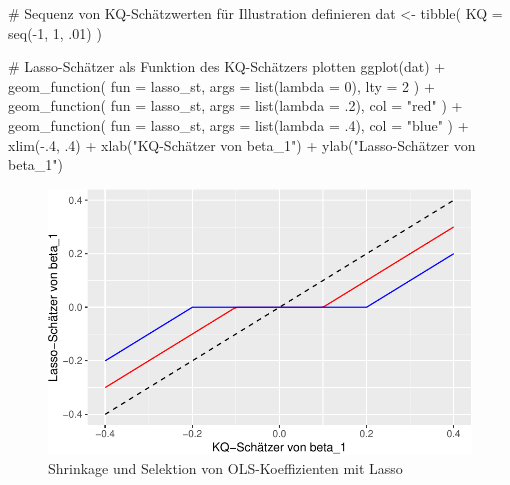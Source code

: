 \documentclass[
  a4paper,
  DIV=11,
  oneside]{scrreprt}
\newenvironment{Shaded}{\begin{snugshade}}{\end{snugshade}}
\newcommand{\AttributeTok}[1]{\textcolor[rgb]{0.40,0.45,0.13}{#1}}
\newcommand{\CommentTok}[1]{\textcolor[rgb]{0.37,0.37,0.37}{#1}}
\newcommand{\DecValTok}[1]{\textcolor[rgb]{0.68,0.00,0.00}{#1}}
\newcommand{\FunctionTok}[1]{\textcolor[rgb]{0.28,0.35,0.67}{#1}}
\newcommand{\NormalTok}[1]{\textcolor[rgb]{0.00,0.23,0.31}{#1}}
\newcommand{\OtherTok}[1]{\textcolor[rgb]{0.00,0.23,0.31}{#1}}
\newcommand{\SpecialCharTok}[1]{\textcolor[rgb]{0.37,0.37,0.37}{#1}}
\newcommand{\StringTok}[1]{\textcolor[rgb]{0.13,0.47,0.30}{#1}}
\begin{document}
\begin{Shaded}
\begin{Highlighting}[]
\CommentTok{\# Sequenz von KQ{-}Schätzwerten für Illustration definieren}
\NormalTok{dat }\OtherTok{\textless{}{-}} \FunctionTok{tibble}\NormalTok{(}
  \AttributeTok{KQ =} \FunctionTok{seq}\NormalTok{(}\SpecialCharTok{{-}}\DecValTok{1}\NormalTok{, }\DecValTok{1}\NormalTok{, .}\DecValTok{01}\NormalTok{)}
\NormalTok{)}

\CommentTok{\# Lasso{-}Schätzer als Funktion des KQ{-}Schätzers plotten}
\FunctionTok{ggplot}\NormalTok{(dat) }\SpecialCharTok{+}
  \FunctionTok{geom\_function}\NormalTok{(}
    \AttributeTok{fun =}\NormalTok{ lasso\_st, }
    \AttributeTok{args =} \FunctionTok{list}\NormalTok{(}\AttributeTok{lambda =} \DecValTok{0}\NormalTok{), }
    \AttributeTok{lty =} \DecValTok{2}
\NormalTok{  ) }\SpecialCharTok{+} 
  \FunctionTok{geom\_function}\NormalTok{(}
    \AttributeTok{fun =}\NormalTok{ lasso\_st, }
    \AttributeTok{args =} \FunctionTok{list}\NormalTok{(}\AttributeTok{lambda =}\NormalTok{ .}\DecValTok{2}\NormalTok{),}
    \AttributeTok{col =} \StringTok{"red"}
\NormalTok{  ) }\SpecialCharTok{+} 
  \FunctionTok{geom\_function}\NormalTok{(}
    \AttributeTok{fun =}\NormalTok{ lasso\_st, }
    \AttributeTok{args =} \FunctionTok{list}\NormalTok{(}\AttributeTok{lambda =}\NormalTok{ .}\DecValTok{4}\NormalTok{), }
    \AttributeTok{col =} \StringTok{"blue"}
\NormalTok{  ) }\SpecialCharTok{+} 
  \FunctionTok{xlim}\NormalTok{(}\SpecialCharTok{{-}}\NormalTok{.}\DecValTok{4}\NormalTok{, .}\DecValTok{4}\NormalTok{) }\SpecialCharTok{+}
  \FunctionTok{xlab}\NormalTok{(}\StringTok{"KQ{-}Schätzer von beta\_1"}\NormalTok{) }\SpecialCharTok{+}
  \FunctionTok{ylab}\NormalTok{(}\StringTok{"Lasso{-}Schätzer von beta\_1"}\NormalTok{)}
\end{Highlighting}
\end{Shaded}

\begin{figure}[t]

{\centering \includegraphics{RegReg_files/figure-pdf/fig-lassoST-1.pdf}

}

\caption{\label{fig-lassoST}Shrinkage und Selektion von
OLS-Koeffizienten mit Lasso}

\end{figure}
\end{document}
